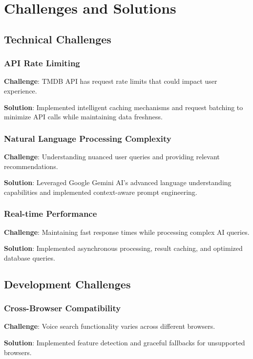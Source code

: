 \documentclass[12pt,a4paper]{article}
\begin{document}
\section{Challenges and Solutions}

\subsection{Technical Challenges}

\subsubsection{API Rate Limiting}
\textbf{Challenge}: TMDB API has request rate limits that could impact user experience.

\textbf{Solution}: Implemented intelligent caching mechanisms and request batching to minimize API calls while maintaining data freshness.

\subsubsection{Natural Language Processing Complexity}
\textbf{Challenge}: Understanding nuanced user queries and providing relevant recommendations.

\textbf{Solution}: Leveraged Google Gemini AI's advanced language understanding capabilities and implemented context-aware prompt engineering.

\subsubsection{Real-time Performance}
\textbf{Challenge}: Maintaining fast response times while processing complex AI queries.

\textbf{Solution}: Implemented asynchronous processing, result caching, and optimized database queries.

\subsection{Development Challenges}

\subsubsection{Cross-Browser Compatibility}
\textbf{Challenge}: Voice search functionality varies across different browsers.

\textbf{Solution}: Implemented feature detection and graceful fallbacks for unsupported browsers.
\end{document}
